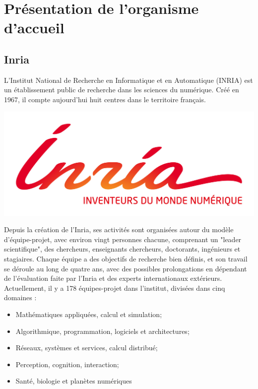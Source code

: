 \section{Présentation de l'organisme d'accueil}
\label{sec:organisme}

\subsection{Inria}
\label{subsec:inria}

\indent L'Institut National de Recherche en Informatique et en Automatique (INRIA) est un établissement public de recherche dans les sciences du numérique. Créé en 1967, il compte aujourd'hui huit centres dans le territoire français. 

\begingroup
\centering
\includegraphics[scale=.3]{figures/logos/Inria.jpg}
\endgroup

\indent Depuis la création de l'Inria, ses activités sont organisées autour du modèle d'équipe-projet, avec environ vingt personnes chacune, comprenant un "leader scientifique", des chercheurs, enseignants chercheurs, doctorants, ingénieurs et stagiaires. Chaque équipe a des objectifs de recherche bien définis, et son travail se déroule au long de quatre ans, avec des possibles prolongations en dépendant de l'évaluation faite par l'Inria et des experts internationaux extérieurs. Actuellement, il y a 178 équipes-projet dans l'institut, divisées dans cinq domaines : 

\begin{itemize}
	\item Mathématiques appliquées, calcul et simulation;
	\item Algorithmique, programmation, logiciels et architectures;
	\item Réseaux, systèmes et services, calcul distribué;
	\item Perception, cognition, interaction;
	\item Santé, biologie et planètes numériques
\end{itemize}

